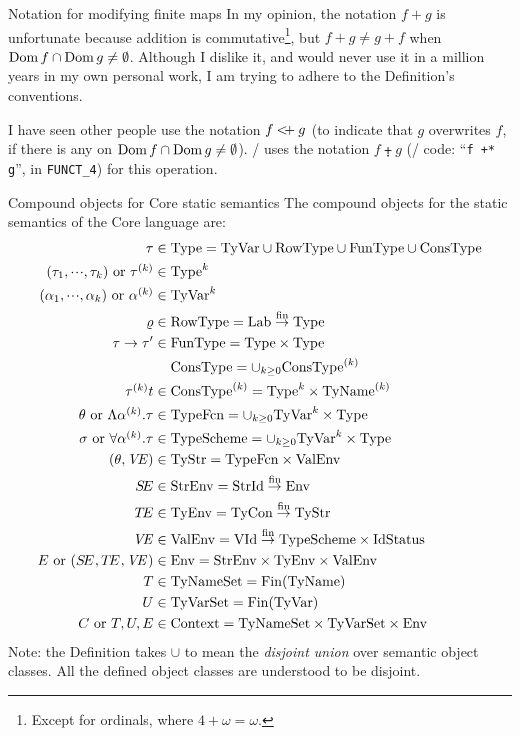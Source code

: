 \begin{remark}{Notation for modifying finite maps}
In my opinion, the notation $f+g$ is unfortunate because addition is
commutative\footnote{Except for ordinals, where $4+\omega=\omega$.}, but $f+g\neq g+f$ when
$\mathop{\rm Dom}\nolimits f\cap\mathop{\rm Dom}\nolimits g\neq\emptyset$. Although I dislike it, and would never
use it in a million years in my own personal work, I am trying to adhere
to the Definition's conventions.

I have seen other people use the notation $f\mathbin{{<}\mskip-4mu{+}}g$ (to indicate
that $g$ overwrites $f$, if there is any on $\mathop{\rm Dom}\nolimits f\cap\mathop{\rm Dom}\nolimits g\neq\emptyset$).
\Mizar/ uses the notation $f\plusdot g$ (\Mizar/ code: ``\verb|f +* g|'', in
\verb|FUNCT_4|) for this operation.
\end{remark}

\begin{clause}{Compound objects for Core static semantics}
The compound objects for the static semantics of the Core language are:
\begin{align*}
        \tau    & \in \Type = \TyVar\cup\RowType\cup\FunType\cup\ConsType\\
 \longtauk\ {\rm or}\ \tauk
                & \in  \Type^k\\
 \longalphak\ {\rm or}\ \alphak
                & \in  \TyVar^k\\
 \varrho        & \in  \RowType = \finfun{\Lab}{\Type} \\
 \tau\rightarrow\tau'
                & \in  \FunType = \Type\times\Type \\
                & \mathrel{\phantom{\in}} \ConsType = \cup_{k\geq 0}\ConsType^{(k)}\\
        \tauk t & \in  \ConsType^{(k)} = \Type^k\times\TyNamesk  \\
\typefcn\ {\rm or}\ \typefcnk
                & \in  \TypeFcn = \cup_{k\geq 0}\TyVar^k\times\Type\\
\tych\ {\rm or}\ \longtych
                & \in  \TypeScheme = \cup_{k\geq 0}\TyVar^k\times\Type\\
(\theta,\VE)    & \in  \TyStr = \TypeFcn\times\ValEnv\\
\SE             & \in  \StrEnv = \finfun{\StrId}{\Env}\\
\TE             & \in  \TyEnv = \finfun{\TyCon}{\TyStr}\\
\VE             & \in  \ValEnv = \finfun{\VId}{\TypeScheme\times\IdStatus}\\
\E\ {\rm or}\ \newlongE{}
                & \in  \Env = \StrEnv\times\TyEnv\times\ValEnv\\
\T              & \in  \TyNameSets = \Fin(\TyNames)\\
\U              & \in  \TyVarSet = \Fin(\TyVar)\\
\C\ {\rm or}\ \T,\U,\E   & \in  \Context = \TyNameSets\times\TyVarSet\times\Env
\end{align*}
Note: the Definition takes $\cup$ to mean the \emph{disjoint union} over
semantic object classes. All the defined object classes are understood
to be disjoint.
\end{clause}

